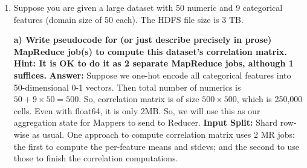 \documentclass{article}
\begin{document}
\begin{enumerate}[label=\textbf{Question \arabic*.}]
---

\item Suppose you are given a large dataset with 50 numeric and 9 categorical features (domain size of 50 each). The HDFS file size is 3 TB.

  \textbf{a) Write pseudocode for (or just describe precisely in prose) MapReduce job(s) to compute this dataset's correlation matrix. Hint: It is OK to do it as 2 separate MapReduce jobs, although 1 suffices.}
    \textbf{Answer:}
    Suppose we one-hot encode all categorical features into 50-dimensional 0-1 vectors. Then total number of numerics is $50 + 9 \times 50 = 500$. So, correlation matrix is of size $500 \times 500$, which is 250,000 cells. Even with float64, it is only 2MB. So, we will use this as our aggregation state for Mappers to send to Reducer.
    \textbf{Input Split:} Shard row-wise as usual. One approach to compute correlation matrix uses 2 MR jobs: the first to compute the per-feature means and stdevs; and the second to use those to finish the correlation computations.


\end{enumerate}
\end{document}
